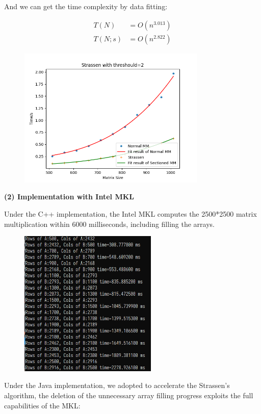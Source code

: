 \documentclass[UTF8]{ctexart}
\begin{document}
And we can get the time complexity by data fitting:

\begin{equation}
  \begin{aligned}
    T(N)   & =O(n^{3.013}) \\
    T(N;s) & =O(n^{2.822})
  \end{aligned}
\end{equation}

\begin{figure}[htb]
  \centering
  \includegraphics[height=6.7cm]{../ppt/slide-UIBK/sub_naive.png}
  \caption{}
\end{figure}

\textbf{(2) Implementation with Intel MKL}

Under the C++ implementation, the Intel MKL computes the 2500*2500
matrix multiplication within 6000 milliseconds, including filling the
arrays.

\begin{figure}[htb]
  \centering
  \includegraphics[height=7.0cm]{../ppt/slide-UIBK/mkl_dgemm.png}
  \caption{}
\end{figure}

Under the Java implementation, we adopted to accelerate the Strassen's
algorithm, the deletion of the unnecessary array filling progress
exploits the full capabilities of the MKL:
\end{document}
